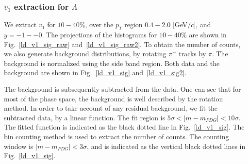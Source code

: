 \subsubsection{$v_1$ extraction for $\Lambda$}

We extract $v_1$ for $10-40\%$, over the $p_{T}$ region $0.4-2.0$ [GeV/$c$], and $y=-1 --0$. 
The projections of the histograms for $10-40\%$ are shown in Fig.~\ref{ld_v1_sig_raw} and~\ref{ld_v1_sig_raw2}. To obtain the number of counts, we also generate background distributions, by rotating $\pi^{-}$ tracks by $\pi$. The background is normalized using the side band region. Both data and the background are shown in Fig.~\ref{ld_v1_sig} and~\ref{ld_v1_sig2}.

The background is subsequently subtracted from the data. One can see that for most of the phase space, the background is well described by the rotation method. In order to take account of any residual background, we fit the subtracted data, by a linear function. The fit region is $5\sigma<|m-m_{PDG}|<10\sigma$. The fitted function is indicated as the black dotted line in Fig.~\ref{ld_v1_sig}. The bin counting method is used to extract the number of counts. The counting window is $|m-m_{PDG}|<3\sigma$, and is indicated as the vertical black dotted lines in Fig.~\ref{ld_v1_sig}.



